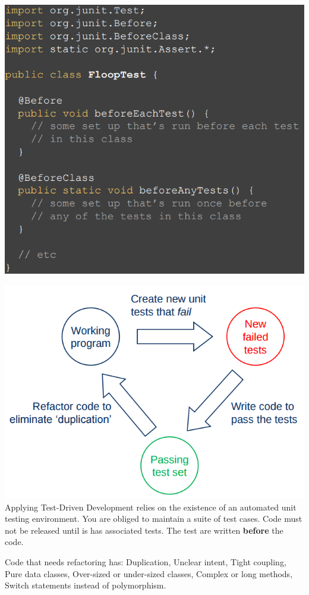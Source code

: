\documentclass[number]{assignment}
\begin{document}
\begin{landscape}
\begin{multicols}{3}
\begin{multicols}{2}
\includegraphics[width=\linewidth]{test2.png}
\end{multicols}
\begin{multicols}{2}
\includegraphics[width=\linewidth]{Cycle.png}
Applying Test-Driven Development relies on the existence of an automated unit testing environment. You are obliged to maintain a suite of test cases. Code must not be released until is has associated tests. The test are written \textbf{before} the code.
\end{multicols}
Code that needs refactoring has: Duplication, Unclear intent, Tight coupling, Pure data classes, Over-sized or under-sized classes, Complex or long methods, Switch statements instead of polymorphism.

\end{multicols}
\end{landscape}
\end{document}
